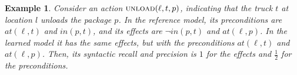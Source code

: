 \documentclass[letterpaper]{article} %
\newcommand{\realm}{{\ensuremath{M^*}}\xspace}
\newif\ifaddcomments
\newcommand{\roni}[1]{\ifaddcomments{\textcolor{red}{[Roni: #1]}}\fi}
\newcommand{\mauro}[1]{\ifaddcomments{\textcolor{green}{[Mauro: #1]}}\fi}
\newcommand{\gregor}[1]{\ifaddcomments{\textcolor{orange}{[Gregor: #1]}}\fi}
\newtheorem{example}{Example}
\begin{document}
\begin{example}
Consider an action $\textsc{unload}(\ell, t, p)$, indicating that the truck $t$ at location $l$ unloads the package $p$. 
In the reference model, its preconditions are $\textit{at}(\ell, t)$ and $\textit{in}(p,t)$, and its effects are $\neg \textit{in}(p,t)$ and $\textit{at}(\ell,p)$.
In the learned model it has the same effects, but with the preconditions $\textit{at}(\ell, t)$ and $\textit{at}(\ell, p)$. 
Then, its syntactic recall and precision is $1$ for the effects and $\frac 1 2$ for the preconditions. 
\end{example}
\end{document}
